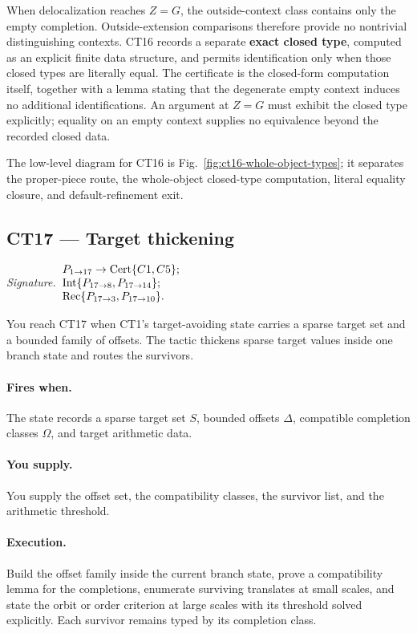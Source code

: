\documentclass[
  11pt,
]{article}
\theoremstyle{definition}
\newcommand{\ctsignature}[1]{\par\noindent\emph{Signature.}\ #1\par\medskip}
\newcommand{\ctcert}[1]{\mathrm{Cert}\{#1\}}
\newcommand{\ctint}[1]{\mathrm{Int}\{#1\}}
\newcommand{\ctrec}[1]{\mathrm{Rec}\{#1\}}
\newcommand{\ctpar}[1]{\paragraph{#1.}}
\begin{document}
When delocalization reaches \(Z=G\), the outside-context class contains
only the empty completion. Outside-extension comparisons therefore
provide no nontrivial distinguishing contexts. CT16 records a separate
\textbf{exact closed type}, computed as an explicit finite data structure,
and permits identification only when those closed types are literally
equal. The certificate is
the closed-form computation itself, together with a lemma stating that
the degenerate empty context induces no additional identifications. An
argument at \(Z=G\) must exhibit the closed type explicitly; equality on
an empty context supplies no equivalence beyond the recorded closed
data.

The low-level diagram for CT16 is Fig.~\ref{fig:ct16-whole-object-types};
it separates the proper-piece route, the whole-object closed-type
computation, literal equality closure, and default-refinement exit.



\subsection{CT17 --- Target thickening}\label{ct:17}\label{target-thickening-bounded-offsets-against-sparse-targets}
\ctsignature{\(\begin{array}{@{}l@{}}
P_{1\to17}\to \ctcert{C1,C5};\\
\ctint{P_{17\to8},P_{17\to14}};\\
\ctrec{P_{17\to3},P_{17\to10}}.
\end{array}\)}

You reach CT17 when CT1's target-avoiding state carries a sparse target
set and a bounded family of offsets.  The tactic thickens sparse target
values inside one branch state and routes the survivors.

\ctpar{Fires when}
The state records a sparse target set \(S\), bounded offsets \(\Delta\),
compatible completion classes \(\Omega\), and target arithmetic data.

\ctpar{You supply}
You supply the offset set, the compatibility classes, the survivor list,
and the arithmetic threshold.

\ctpar{Execution}
Build the offset family inside the current branch state, prove a
compatibility lemma for the completions, enumerate surviving translates
at small scales, and state the orbit or order criterion at
large scales with its threshold solved explicitly.  Each survivor remains
typed by its completion class.
\end{document}
